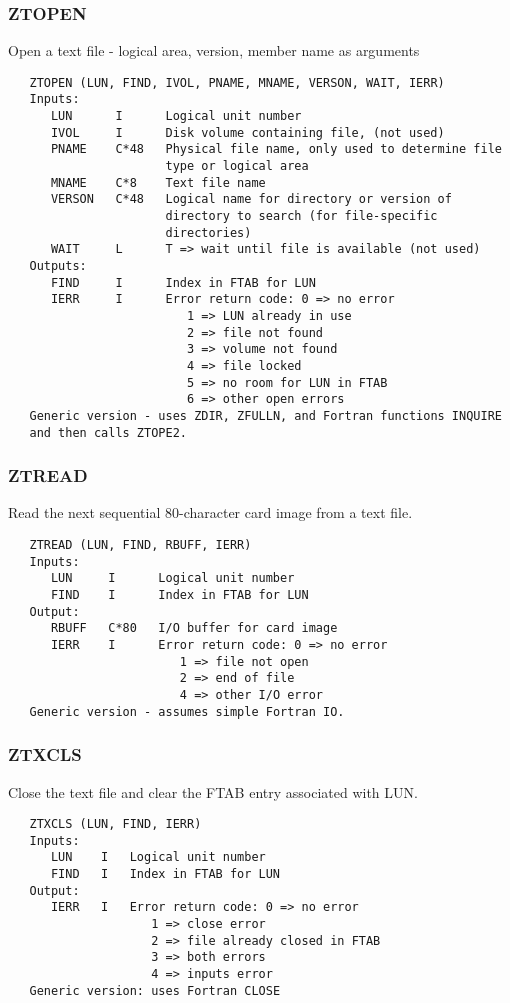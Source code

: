 \subsubsection{ZTOPEN}
Open a text file - logical area, version, member name as arguments
\begin{verbatim}
   ZTOPEN (LUN, FIND, IVOL, PNAME, MNAME, VERSON, WAIT, IERR)
   Inputs:
      LUN      I      Logical unit number
      IVOL     I      Disk volume containing file, (not used)
      PNAME    C*48   Physical file name, only used to determine file
                      type or logical area
      MNAME    C*8    Text file name
      VERSON   C*48   Logical name for directory or version of
                      directory to search (for file-specific
                      directories)
      WAIT     L      T => wait until file is available (not used)
   Outputs:
      FIND     I      Index in FTAB for LUN
      IERR     I      Error return code: 0 => no error
                         1 => LUN already in use
                         2 => file not found
                         3 => volume not found
                         4 => file locked
                         5 => no room for LUN in FTAB
                         6 => other open errors
   Generic version - uses ZDIR, ZFULLN, and Fortran functions INQUIRE
   and then calls ZTOPE2.
\end{verbatim}

\subsubsection{ZTREAD}
Read the next sequential 80-character card image from a text file.
\begin{verbatim}
   ZTREAD (LUN, FIND, RBUFF, IERR)
   Inputs:
      LUN     I      Logical unit number
      FIND    I      Index in FTAB for LUN
   Output:
      RBUFF   C*80   I/O buffer for card image
      IERR    I      Error return code: 0 => no error
                        1 => file not open
                        2 => end of file
                        4 => other I/O error
   Generic version - assumes simple Fortran IO.
\end{verbatim}

\subsubsection{ZTXCLS}
Close the text file and clear the FTAB entry associated with LUN.
\begin{verbatim}
   ZTXCLS (LUN, FIND, IERR)
   Inputs:
      LUN    I   Logical unit number
      FIND   I   Index in FTAB for LUN
   Output:
      IERR   I   Error return code: 0 => no error
                    1 => close error
                    2 => file already closed in FTAB
                    3 => both errors
                    4 => inputs error
   Generic version: uses Fortran CLOSE
\end{verbatim}

